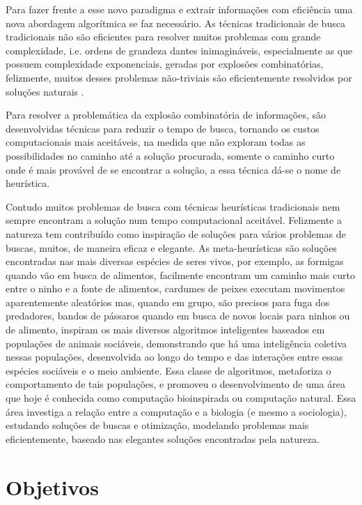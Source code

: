 \documentclass[conference,compsoc]{IEEEtran}
\begin{document}
Para fazer frente a esse novo paradigma e extrair informações com eficiência uma nova abordagem algorítmica se faz necessário. 
As técnicas tradicionais de busca tradicionais não são eficientes para resolver muitos problemas com grande complexidade, i.e. ordens de grandeza 
dantes inimagináveis, especialmente as que possuem complexidade exponenciais, geradas por explosões combinatórias, felizmente, 
muitos desses problemas não-triviais são eficientemente resolvidos por soluções naturais \cite{Swarm_Medeiros}.

Para resolver a problemática da explosão combinatória de informações, são desenvolvidas técnicas para reduzir o tempo de busca, 
tornando os custos computacionais mais aceitáveis, na medida que não exploram todas as possibilidades no caminho até a 
solução procurada, somente o caminho curto onde é mais provável de se encontrar a solução, a essa técnica dá-se o nome de heurística.

Contudo muitos problemas de busca com técnicas heurísticas tradicionais nem sempre encontram a solução num tempo computacional
aceitável. Felizmente a natureza tem contribuído como inspiração de soluções para vários problemas de buscas, muitos, de maneira 
eficaz e elegante. As meta-heurísticas são soluções encontradas nas mais diversas espécies de seres vivos, por exemplo, as formigas quando 
vão em busca de alimentos, facilmente encontram um caminho mais curto entre o ninho e a fonte de alimentos, cardumes de peixes 
executam movimentos aparentemente aleatórios mas, quando em grupo, são precisos para fuga dos predadores, bandos de pássaros 
quando em busca de novos locais para ninhos ou de alimento, inspiram os mais diversos algoritmos inteligentes baseados em 
populações de animais sociáveis, demonstrando que há uma inteligência coletiva nessas populações, desenvolvida ao longo do 
tempo e das interações entre essas espécies sociáveis e o meio ambiente. Essa classe de algoritmos, metaforiza o comportamento 
de tais populações, e promoveu o desenvolvimento de uma área que hoje é conhecida como computação bioinspirada ou computação 
natural. Essa área investiga a relação entre a computação e a biologia (e mesmo a sociologia), estudando soluções de buscas 
e otimização, modelando problemas mais eficientemente, baseado nas elegantes soluções encontradas pela natureza.


\section{Objetivos}
\end{document}
